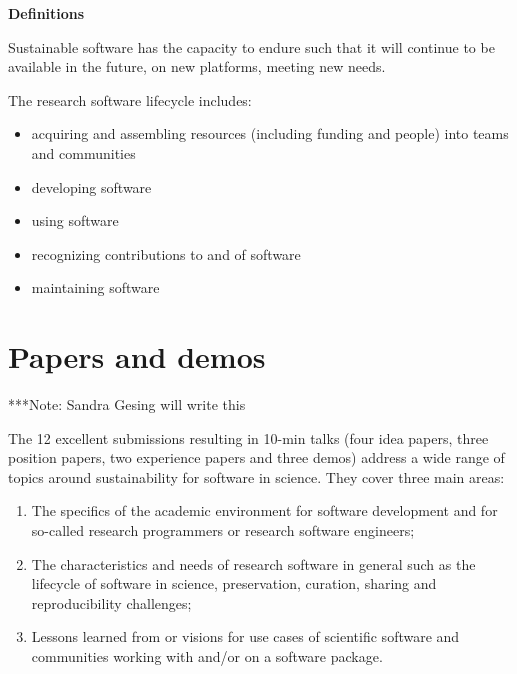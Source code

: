 \documentclass[11pt, oneside]{amsart}
\newcommand{\note}[1]{ {\textcolor{blueish}    { ***Note:      #1 }}}
\begin{document}
{\bf Definitions}

Sustainable software has the capacity to endure such that it will continue to be available in the future, on new platforms, meeting new needs.

The research software lifecycle includes:
\begin{itemize}
\item acquiring and assembling resources (including funding and people) into teams and communities
\item developing software
\item using software
\item recognizing contributions to and of software
\item maintaining software
\end{itemize}


\section{Papers and demos} \label{sec:papers}

\note{Sandra Gesing will write this}

The 12 excellent submissions resulting in 10-min talks (four idea papers, three position papers, two experience papers and three demos) address a wide range of topics around sustainability for software in science. They cover three main areas: 
\begin{enumerate}
\item The specifics of the academic environment for software development and for so-called research programmers or research software engineers;
\item The characteristics and needs of research software in general such as  the lifecycle of software in science, preservation, curation, sharing and reproducibility challenges;
\item Lessons learned from or visions for use cases of scientific software and communities working with and/or on a software package.
\end{enumerate}
\end{document}
